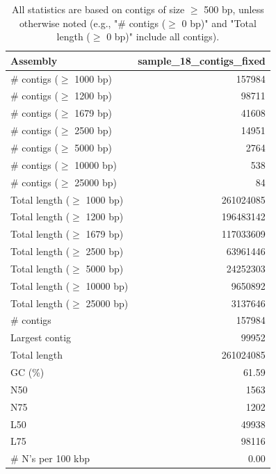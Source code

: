 \documentclass[12pt,a4paper]{article}
\begin{document}
\begin{table}[ht]
\begin{center}
\caption{All statistics are based on contigs of size $\geq$ 500 bp, unless otherwise noted (e.g., "\# contigs ($\geq$ 0 bp)" and "Total length ($\geq$ 0 bp)" include all contigs).}
\begin{tabular}{|l*{1}{|r}|}
\hline
Assembly & sample\_18\_contigs\_fixed \\ \hline
\# contigs ($\geq$ 1000 bp) & 157984 \\ \hline
\# contigs ($\geq$ 1200 bp) & 98711 \\ \hline
\# contigs ($\geq$ 1679 bp) & 41608 \\ \hline
\# contigs ($\geq$ 2500 bp) & 14951 \\ \hline
\# contigs ($\geq$ 5000 bp) & 2764 \\ \hline
\# contigs ($\geq$ 10000 bp) & 538 \\ \hline
\# contigs ($\geq$ 25000 bp) & 84 \\ \hline
Total length ($\geq$ 1000 bp) & 261024085 \\ \hline
Total length ($\geq$ 1200 bp) & 196483142 \\ \hline
Total length ($\geq$ 1679 bp) & 117033609 \\ \hline
Total length ($\geq$ 2500 bp) & 63961446 \\ \hline
Total length ($\geq$ 5000 bp) & 24252303 \\ \hline
Total length ($\geq$ 10000 bp) & 9650892 \\ \hline
Total length ($\geq$ 25000 bp) & 3137646 \\ \hline
\# contigs & 157984 \\ \hline
Largest contig & 99952 \\ \hline
Total length & 261024085 \\ \hline
GC (\%) & 61.59 \\ \hline
N50 & 1563 \\ \hline
N75 & 1202 \\ \hline
L50 & 49938 \\ \hline
L75 & 98116 \\ \hline
\# N's per 100 kbp & 0.00 \\ \hline
\end{tabular}
\end{center}
\end{table}
\end{document}
